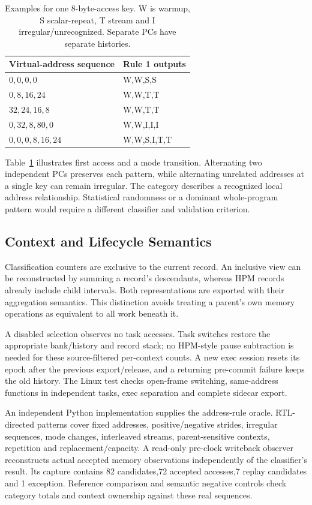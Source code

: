 \begin{table}[t]
\centering\small
\begin{tabular}{ll}\toprule
Virtual-address sequence & Rule 1 outputs\\\midrule
$0,0,0,0$ & W,W,S,S\\
$0,8,16,24$ & W,W,T,T\\
$32,24,16,8$ & W,W,T,T\\
$0,32,8,80,0$ & W,W,I,I,I\\
$0,0,0,8,16,24$ & W,W,S,I,T,T\\\bottomrule
\end{tabular}
\caption{Examples for one 8-byte-access key. W is warmup, S scalar-repeat, T stream and I irregular/unrecognized. Separate PCs have separate histories.}
\label{tab:patterns}
\end{table}

Table~\ref{tab:patterns} illustrates first access and a mode transition. Alternating two independent PCs preserves each pattern, while alternating unrelated addresses at a single key can remain irregular. The category describes a recognized local address relationship. Statistical randomness or a dominant whole-program pattern would require a different classifier and validation criterion.

\subsection{Context and Lifecycle Semantics}
Classification counters are exclusive to the current record. An inclusive view can be reconstructed by summing a record's descendants, whereas HPM records already include child intervals. Both representations are exported with their aggregation semantics. This distinction avoids treating a parent's own memory operations as equivalent to all work beneath it.

A disabled selection observes no task accesses. Task switches restore the appropriate bank/history and record stack; no HPM-style pause subtraction is needed for these source-filtered per-context counts. A new exec session resets its epoch after the previous export/release, and a returning pre-commit failure keeps the old history. The Linux test checks open-frame switching, same-address functions in independent tasks, exec separation and complete sidecar export.

An independent Python implementation supplies the address-rule oracle. RTL-directed patterns cover fixed addresses, positive/negative strides, irregular sequences, mode changes, interleaved streams, parent-sensitive contexts, repetition and replacement/capacity. A read-only pre-clock writeback observer reconstructs actual accepted memory observations independently of the classifier's result. Its capture contains 82 candidates,72 accepted accesses,7 replay candidates and 1 exception. Reference comparison and semantic negative controls check category totals and context ownership against these real sequences.
